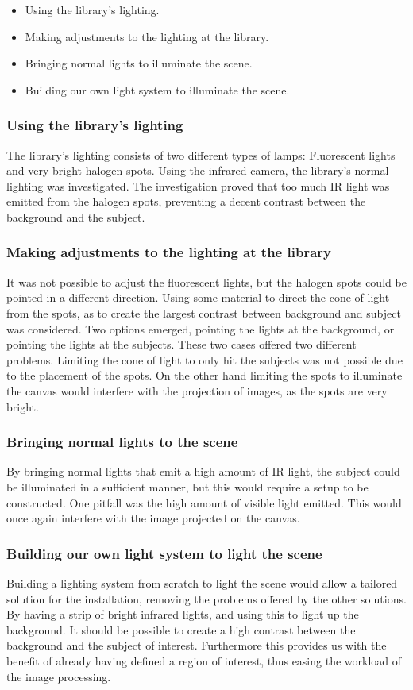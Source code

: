 \begin{itemize}
\item Using the library's lighting.
\item Making adjustments to the lighting at the library.
\item Bringing normal lights to illuminate the scene.
\item Building our own light system to illuminate the scene.
\end{itemize}

\subsubsection{Using the library's lighting}
The library's lighting consists of two different types of lamps: Fluorescent lights and very bright halogen spots. Using the infrared camera, the library's normal lighting was investigated. The investigation proved that too much IR light was emitted from the halogen spots, preventing a decent contrast between the background and the subject.

\subsubsection{Making adjustments to the lighting at the library}
It was not possible to adjust the fluorescent lights, but the halogen spots could be pointed in a different direction. Using some material to direct the cone of light from the spots, as to create the largest contrast between background and subject was considered. Two options emerged, pointing the lights at the background, or pointing the lights at the subjects. These two cases offered two different problems. Limiting the cone of light to only hit the subjects was not possible due to the placement of the spots. On the other hand limiting the spots to illuminate the canvas would interfere with the projection of images, as the spots are very bright.

\subsubsection{Bringing normal lights to the scene} 
By bringing normal lights that emit a high amount of IR light, the subject could be illuminated in a sufficient manner, but this would require a setup to be constructed. One pitfall was the high amount of visible light emitted. This would once again interfere with the image projected on the canvas.

\subsubsection{Building our own light system to light the scene}
Building a lighting system from scratch to light the scene would allow a tailored solution for the installation, removing the problems offered by the other solutions. By having a strip of bright infrared lights, and using this to light up the background. It should be possible to create a high contrast between the background and the subject of interest. Furthermore this provides us with the benefit of already having defined a region of interest, thus easing the workload of the image processing.

